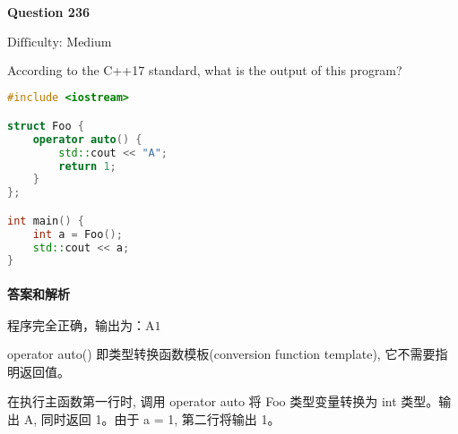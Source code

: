 \documentclass{article}
\begin{document}
	\paragraph*{Question 236} $\boxed{\text{Difficulty: Medium}} $			
	
	According to the C++17 standard, what is the output of this program?
	
	\begin{lstlisting}[language=C++]  		
#include <iostream>

struct Foo {
	operator auto() {
		std::cout << "A";
		return 1;
	}
};

int main() {
	int a = Foo();
	std::cout << a;
}
	\end{lstlisting}
	
	\paragraph*{答案和解析} $\boxed{\text{程序完全正确，输出为：A1}} $
	
	operator auto() 即类型转换函数模板(conversion function template), 它不需要指明返回值。
	
	在执行主函数第一行时, 调用 operator auto 将 Foo 类型变量转换为 int 类型。输出 A, 同时返回 1。由于 a = 1, 第二行将输出 1。
\end{document}
